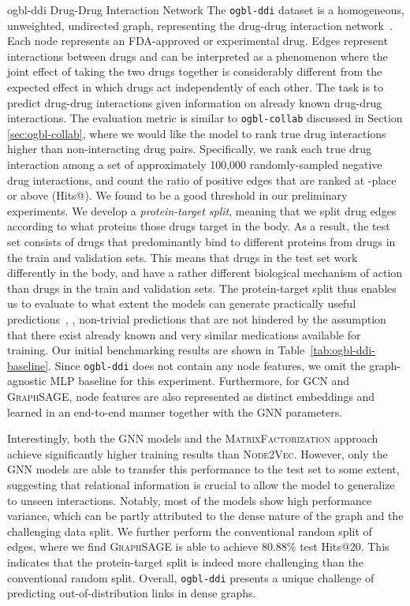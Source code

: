 \dataset
{ogbl-ddi}
{Drug-Drug Interaction Network}
{The \texttt{ogbl-ddi} dataset is a homogeneous, unweighted, undirected graph, representing the drug-drug interaction network~\citep{wishart2018drugbank}. Each node represents an FDA-approved or experimental drug. Edges represent interactions between drugs and can be interpreted as a phenomenon where the joint effect of taking the two drugs together is considerably different from the expected effect in which drugs act independently of each other. }
{The task is to predict drug-drug interactions given information on already known drug-drug interactions.  The evaluation metric is similar to \texttt{ogbl-collab} discussed in Section \ref{sec:ogbl-collab}, where we would like the model to rank true drug interactions higher than non-interacting drug pairs. Specifically, we rank each true drug interaction among a set of approximately 100,000 randomly-sampled negative drug interactions, and count the ratio of positive edges that are ranked at -place or above (Hits@). We found  to be a good threshold in our preliminary experiments.}
{We develop a \emph{protein-target split}, meaning that we split drug edges according to what proteins those drugs target in the body. As a result, the test set consists of drugs that predominantly bind to different proteins from drugs in the train and validation sets. This means that drugs in the test set work differently in the body, and have a rather different biological mechanism of action than drugs in the train and validation sets. The protein-target split thus enables us to evaluate to what extent the models can generate practically useful predictions~\citep{guney2017reproducible}, \ie, non-trivial predictions that are not hindered by the assumption that there exist already known and very similar medications available for training.}
{Our initial benchmarking results are shown in Table~\ref{tab:ogbl-ddi-baseline}.
Since \texttt{ogbl-ddi} does not contain any node features, we omit the graph-agnostic \textsc{MLP} baseline for this experiment.
Furthermore, for \textsc{GCN} and \textsc{GraphSAGE}, node features are also represented as distinct embeddings and learned in an end-to-end manner together with the GNN parameters.}

Interestingly, both the GNN models and the \textsc{MatrixFactorization} approach achieve significantly higher training results than \textsc{Node2Vec}. 
However, only the GNN models are able to transfer this performance to the test set to some extent, suggesting that relational information is crucial to allow the model to generalize to unseen interactions.
Notably, most of the models show high performance variance, which can be partly attributed to the dense nature of the graph and the challenging data split.
We further perform the conventional random split of edges, where we find \textsc{GraphSAGE} is able to achieve 80.88\% test Hits@20. This indicates that the protein-target split is indeed more challenging than the conventional random split.
Overall, \texttt{ogbl-ddi} presents a unique challenge of predicting out-of-distribution links in dense graphs.

